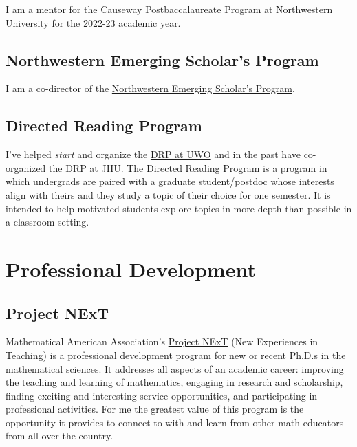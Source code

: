 \documentclass[
]{report}
\begin{document}
I am a mentor for the \href{https://sites.northwestern.edu/causeway/}{Causeway Postbaccalaureate Program}
at Northwestern University for the 2022-23 academic year.

\hypertarget{northwestern-emerging-scholars-program}{%
\section{Northwestern Emerging Scholar's Program}\label{northwestern-emerging-scholars-program}}

I am a co-director of the \href{https://www.math.northwestern.edu/undergraduate/prizes-competitions-organizations/northwestern-emerging-scholars.html}{Northwestern Emerging Scholar's
Program}.

\hypertarget{directed-reading-program}{%
\section{Directed Reading Program}\label{directed-reading-program}}

I've helped \emph{start} and organize the \href{https://www.math.uwo.ca/undergraduate/current_students/directed_reading_program.html}{DRP at
UWO} and in
the past have co-organized the \href{https://math.jhu.edu/drp.html}{DRP at JHU}. The Directed Reading
Program is a program in which undergrads are paired with a graduate student/postdoc whose interests
align with theirs and they study a topic of their choice for one semester. It is intended to help
motivated students explore topics in more depth than possible in a classroom setting.

\hypertarget{professional-development-1}{%
\chapter{Professional Development}\label{professional-development-1}}

\hypertarget{project-next}{%
\section{Project NExT}\label{project-next}}

Mathematical American Association's \href{https://www.maa.org/programs-and-communities/professional-development/project-next}{Project
NExT} (New
Experiences in Teaching) is a professional development program for new or recent Ph.D.s in the
mathematical sciences. It addresses all aspects of an academic career: improving the teaching and
learning of mathematics, engaging in research and scholarship, finding exciting and interesting
service opportunities, and participating in professional activities. For me the greatest value of
this program is the opportunity it provides to connect to with and learn from other math educators
from all over the country.
\end{document}
